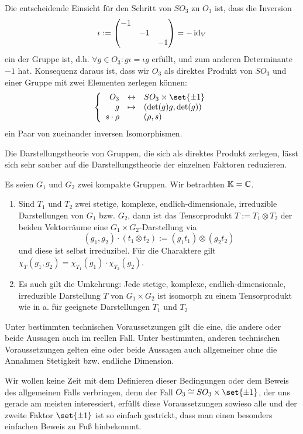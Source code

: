 \begin{remark}
Die entscheidende Einsicht für den Schritt von $SO_3$ zu $O_3$ ist, dass die Inversion
\[\iota := \begin{pmatrix} -1 && \\ &-1& \\ &&-1 \end{pmatrix} = -\operatorname{id}_V\]
ein  der Gruppe ist, d.h. $\forall g\in O_3: g\iota = \iota g$ erfüllt, und zum anderen Determinante $-1$ hat. Konsequenz daraus ist, dass wir $O_3$ als direktes Produkt von $SO_3$ und einer Gruppe mit zwei Elementen zerlegen können:
\[\left\lbrace
\begin{array}{rcl}
O_3 & \leftrightarrow & SO_3 \times \set{\pm 1} \\
g &\mapsto& (\det(g)g, \det(g)) \\
s\cdot\rho && (\rho,s) 
\end{array}
\right.\]
ein Paar von zueinander inversen Isomorphismen.

\medbreak
Die Darstellungstheorie von Gruppen, die sich als direktes Produkt zerlegen, lässt sich sehr sauber auf die Darstellungstheorie der einzelnen Faktoren reduzieren.
\end{remark}

\begin{theorem}
Es seien $G_1$ und $G_2$ zwei kompakte Gruppen. Wir betrachten $\mathbb{K}=\mathbb{C}$.
\begin{enumerate}
\item Sind $T_1$ und $T_2$ zwei stetige, komplexe, endlich-dimensionale, irreduzible Darstellungen von $G_1$ bzw. $G_2$, dann ist das Tensorprodukt $T:=T_1\otimes T_2$ der beiden Vektorräume eine $G_1\times G_2$-Darstellung via
\[(g_1,g_2) \cdot (t_1\otimes t_2) := (g_1 t_1) \otimes (g_2 t_2) \]
und diese ist selbst irreduzibel. Für die Charaktere gilt $\chi_T(g_1,g_2) = \chi_{T_1}(g_1)\cdot\chi_{T_2}(g_2)$.
\item Es auch gilt die Umkehrung: Jede stetige, komplexe, endlich-dimensionale, irreduzible Darstellung $T$ von $G_1\times G_2$ ist isomorph zu einem Tensorprodukt wie in a. für geeignete Darstellungen $T_1$ und $T_2$
\end{enumerate}
\end{theorem}

\begin{remark}
Unter bestimmten technischen Voraussetzungen gilt die eine, die andere oder beide Aussagen auch im reellen Fall. Unter bestimmten, anderen technischen Voraussetzungen gelten eine oder beide Aussagen auch allgemeiner ohne die Annahmen Stetigkeit bzw. endliche Dimension.

Wir wollen keine Zeit mit dem Definieren dieser Bedingungen oder dem Beweis des allgemeinen Falls verbringen, denn der Fall $O_3\isomorphic SO_3\times\set{\pm 1}$, der uns gerade am meisten interessiert, erfüllt diese Voraussetzungen sowieso alle und der zweite Faktor $\set{\pm1}$ ist so einfach gestrickt, dass man einen besonders einfachen Beweis zu Fuß hinbekommt.
\end{remark}

